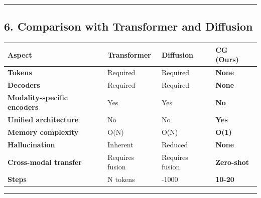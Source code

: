\documentclass[
  11pt,
  a4paper,
]{article}
\begin{document}
\begin{center}\rule{0.5\linewidth}{0.5pt}\end{center}

\subsection{6. Comparison with Transformer and
Diffusion}\label{comparison-with-transformer-and-diffusion}

\begin{longtable}[]{@{}
  >{\raggedright\arraybackslash}p{}
  >{\raggedright\arraybackslash}p{}
  >{\raggedright\arraybackslash}p{}
  >{\raggedright\arraybackslash}p{}@{}}
\toprule\noalign{}
\begin{minipage}[b]{\linewidth}\raggedright
Aspect
\end{minipage} & \begin{minipage}[b]{\linewidth}\raggedright
Transformer
\end{minipage} & \begin{minipage}[b]{\linewidth}\raggedright
Diffusion
\end{minipage} & \begin{minipage}[b]{\linewidth}\raggedright
\textbf{CG (Ours)}
\end{minipage} \\
\midrule\noalign{}
\endhead
\bottomrule\noalign{}
\endlastfoot
\textbf{Tokens} & Required & Required & \textbf{None} \\
\textbf{Decoders} & Required & Required & \textbf{None} \\
\textbf{Modality-specific encoders} & Yes & Yes & \textbf{No} \\
\textbf{Unified architecture} & No & No & \textbf{Yes} \\
\textbf{Memory complexity} & O(N) & O(N) & \textbf{O(1)} \\
\textbf{Hallucination} & Inherent & Reduced & \textbf{None} \\
\textbf{Cross-modal transfer} & Requires fusion & Requires fusion &
\textbf{Zero-shot} \\
\textbf{Steps} & N tokens & 50-1000 & \textbf{10-20} \\
\end{longtable}

\begin{center}\rule{0.5\linewidth}{0.5pt}\end{center}
\end{document}
